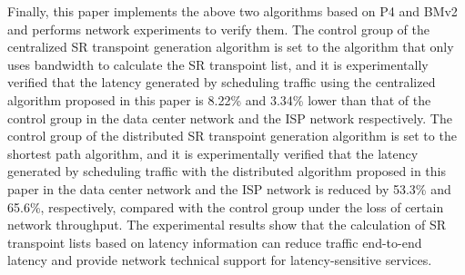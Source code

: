 {Finally, this paper implements the above two algorithms based on P4 and BMv2 and performs network experiments to verify them. The control group of the centralized SR transpoint generation algorithm is set to the algorithm that only uses bandwidth to calculate the SR transpoint list, and it is experimentally verified that the latency generated by scheduling traffic using the centralized algorithm proposed in this paper is 8.22\% and 3.34\% lower than that of the control group in the data center network and the ISP network respectively. The control group of the distributed SR transpoint generation algorithm is set to the shortest path algorithm, and it is experimentally verified that the latency generated by scheduling traffic with the distributed algorithm proposed in this paper in the data center network and the ISP network is reduced by 53.3\% and 65.6\%, respectively, compared with the control group under the loss of certain network throughput. The experimental results show that the calculation of SR transpoint lists based on latency information can reduce traffic end-to-end latency and provide network technical support for latency-sensitive services.
}

